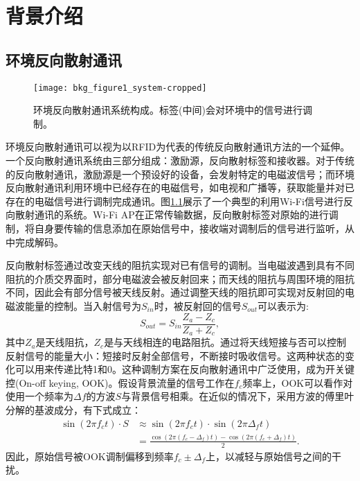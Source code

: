 \chapter{背景介绍}
\label{chap:background}
\section{环境反向散射通讯}
\begin{figure}
	\centering
	\texttt{[image: bkg\_figure1\_system-cropped]}
	\caption{环境反向散射通讯系统构成。标签(中间)会对环境中的信号进行调制。}
	\label{fig:system}
\end{figure}
环境反向散射通讯可以视为以RFID为代表的传统反向散射通讯方法的一个延伸。一个反向散射通讯系统由三部分组成：激励源，反向散射标签和接收器。对于传统的反向散射通讯，激励源是一个预设好的设备，会发射特定的电磁波信号；而环境反向散射通讯利用环境中已经存在的电磁信号，如电视和广播等，获取能量并对已存在的电磁信号进行调制完成通讯。图\ref{fig:system}展示了一个典型的利用Wi-Fi信号进行反向散射通讯的系统。Wi-Fi AP在正常传输数据，反向散射标签对原始的进行调制，将自身要传输的信息添加在原始信号中，接收端对调制后的信号进行监听，从中完成解码。

反向散射标签通过改变天线的阻抗实现对已有信号的调制。当电磁波遇到具有不同阻抗的介质交界面时，部分电磁波会被反射回来；而天线的阻抗与周围环境的阻抗不同，因此会有部分信号被天线反射。通过调整天线的阻抗即可实现对反射回的电磁波能量的控制。当入射信号为$S_{in}$时，被反射回的信号$S_{out}$可以表示为:
\begin{equation}
S_{out} = S_{in} \frac{Z_a - Z_c}{Z_a + Z_c},
\end{equation}
其中$Z_a$是天线阻抗，$Z_c$是与天线相连的电路阻抗。通过将天线短接与否可以控制反射信号的能量大小：短接时反射全部信号，不断接时吸收信号。这两种状态的变化可以用来传递比特1和0。这种调制方案在反向散射通讯中广泛使用，成为开关键控(On-off keying, OOK)。假设背景流量的信号工作在$f_c$频率上，OOK可以看作对使用一个频率为$\Delta f$的方波$S$与背景信号相乘。在近似的情况下，采用方波的傅里叶分解的基波成分，有下式成立：
\begin{equation}
\begin{split}
	\sin(2\pi f_c t)\cdot S &\approx \sin(2\pi f_c t)\cdot \sin(2\pi \Delta_f t)\\
	& =\frac{\cos (2\pi (f_c - \Delta_f)t) - \cos (2\pi (f_c + \Delta_f)t)}{2}.
\end{split}
\end{equation}
因此，原始信号被OOK调制偏移到频率$f_c \pm \Delta_f$上，以减轻与原始信号之间的干扰。

